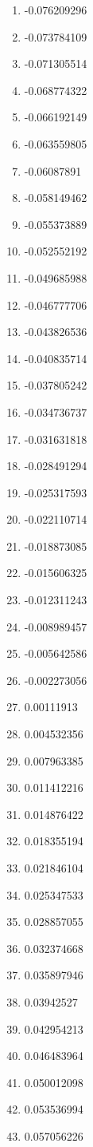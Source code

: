 \documentclass[6pt]{article}
\begin{document}
\begin{multicols}{4}
\begin{enumerate}
		\item -0.076209296
		\item -0.073784109
		\item -0.071305514
		\item -0.068774322
		\item -0.066192149
		\item -0.063559805
		\item -0.06087891
		\item -0.058149462
		\item -0.055373889
		\item -0.052552192
		\item -0.049685988
		\item -0.046777706
		\item -0.043826536
		\item -0.040835714
		\item -0.037805242
		\item -0.034736737
		\item -0.031631818
		\item -0.028491294
		\item -0.025317593
		\item -0.022110714
		\item -0.018873085
		\item -0.015606325
		\item -0.012311243
		\item -0.008989457
		\item -0.005642586
		\item -0.002273056
		\item 0.00111913
		\item 0.004532356
		\item 0.007963385
		\item 0.011412216
		\item 0.014876422
		\item 0.018355194
		\item 0.021846104
		\item 0.025347533
		\item 0.028857055
		\item 0.032374668
		\item 0.035897946
		\item 0.03942527
		\item 0.042954213
		\item 0.046483964
		\item 0.050012098
		\item 0.053536994
		\item 0.057056226

\end{enumerate}
\end{multicols}
\end{document}
